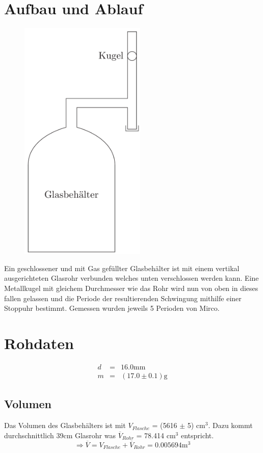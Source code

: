 \documentclass[12pt,a4paper]{article}
\begin{document}
\section*{Aufbau und Ablauf}
\begin{figure}
\vspace{-30pt}
\centering
\includegraphics[width=6cm]{illustration.pdf}
\end{figure}
Ein geschlossener und mit Gas gef\"ullter Glasbeh\"alter ist mit einem vertikal ausgerichteten Glasrohr verbunden welches unten verschlossen werden kann. Eine Metallkugel mit gleichem Durchmesser wie das Rohr wird nun von oben in dieses fallen gelassen und die Periode der resultierenden Schwingung mithilfe einer Stoppuhr bestimmt. Gemessen wurden jeweils 5 Perioden von Mirco.


\section*{Rohdaten}
\begin{eqnarray*}
d & = & 16.0\mbox{mm} \\
m & = & (17.0 \pm 0.1) \mbox{g}
\end{eqnarray*} 
\subsection*{Volumen}
Das Volumen des Glasbeh\"alters ist mit $V_{Flasche}$ = (5616 $\pm $ 5) cm$^3$. Dazu kommt durchschnittlich 39cm Glasrohr was $\overline{V}_{Rohr}$ = 78.414 cm$^3$ entspricht.
\[ \Rightarrow \overline{V} = V_{Flasche} + \overline{V}_{Rohr} = 0.005694\mbox{m}^3 \]
\end{document}
